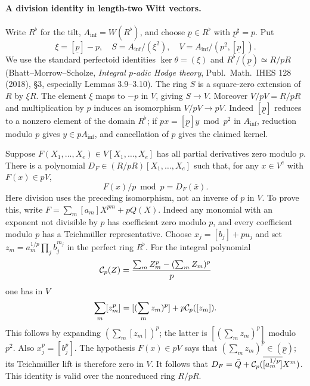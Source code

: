 \paragraph{A division identity in length-two Witt vectors.}
Write \(R^\flat\) for the tilt, \(A_{\inf}=W(R^\flat)\),
and choose \(\underline p\in R^\flat\) with
\(\underline p^\sharp=p\). Put
\[
 \xi=[\underline p]-p,\quad S=A_{\inf}/(\xi^2),\quad
 V=A_{\inf}/(p^2,[\underline p]).
\]
We use the standard perfectoid identities
\(\ker\theta=(\xi)\) and \(R^\flat/(\underline p)\simeq R/pR\)
(Bhatt--Morrow--Scholze, \emph{Integral \(p\)-adic Hodge theory},
Publ.\ Math.\ IHES 128 (2018), \S3, especially Lemmas 3.9--3.10).
The ring \(S\) is a square-zero extension of \(R\) by \(\xi R\).
The element \(\xi\) maps to \(-p\) in \(V\), giving \(S\to V\).
Moreover \(V/pV=R/pR\) and multiplication by \(p\) induces
an isomorphism \(V/pV\to pV\). Indeed
\([\underline p]\) reduces to a nonzero element of the domain
\(R^\flat\); if \(px=[\underline p]y\bmod p^2\) in
\(A_{\inf}\), reduction modulo \(p\) gives \(y\in pA_{\inf}\),
and cancellation of \(p\) gives the claimed kernel.

Suppose \(F(X_1,\ldots,X_e)\in V[X_1,\ldots,X_e]\) has all
partial derivatives zero modulo \(p\). There is a polynomial
\(D_F\in (R/pR)[X_1,\ldots,X_e]\) such that, for any \(x\in V^e\)
with \(F(x)\in pV\),
\begin{equation}\label{eq:aal-witt-division}
 F(x)/p\bmod p=D_F(\bar x).
\end{equation}
Here division uses the preceding isomorphism, not an inverse
of \(p\) in \(V\). To prove this, write
\(F=\sum_m[a_m]X^{pm}+pQ(X)\).
Indeed any monomial with an exponent not divisible by \(p\)
has coefficient zero modulo \(p\), and every coefficient
modulo \(p\) has a Teichm\"uller representative. Choose
\(x_j=[b_j]+pu_j\) and set
\(z_m=a_m^{1/p}\prod_j b_j^{m_j}\) in the perfect ring \(R^\flat\).
For the integral polynomial
\[
 {\cal C}_p(Z)=\frac{\sum_m Z_m^p-(\sum_m Z_m)^p}{p}
\]
one has in \(V\)
\[
 \sum_m[z_m^p]=[(\sum_m z_m)^p]+p{\cal C}_p([z_m]).
\]
This follows by expanding \((\sum_m[z_m])^p\); the latter is
\([(\sum_m z_m)^p]\) modulo \(p^2\). Also \(x_j^p=[b_j^p]\).
The hypothesis \(F(x)\in pV\) says that
\((\sum_m z_m)^p\in(\underline p)\); its Teichm\"uller lift
is therefore zero in \(V\).
It follows that \(D_F=\bar Q+{\cal C}_p(
\overline{[a_m^{1/p}]}X^m)\). This identity is valid over
the nonreduced ring \(R/pR\).

